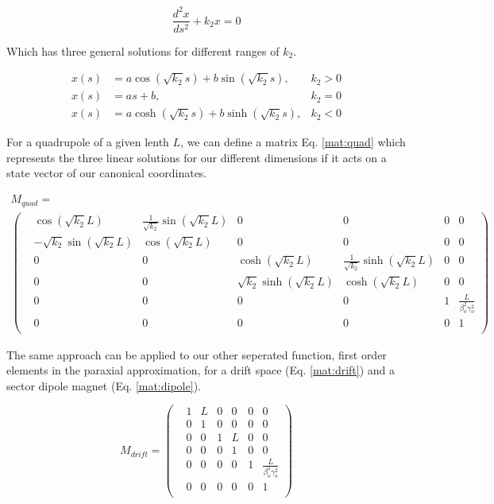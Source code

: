 \begin{equation} \label{eq:hills}
	\frac{d^2 x}{ds^2} + k_2 x = 0
\end{equation}

Which has three general solutions for different ranges of $k_2$.

\begin{align} \label{eq:hillSol}
	x(s) &= a \cos{\left(\sqrt{k_2} s\right)} + b \sin{\left(\sqrt{k_2} s\right)}, &k_2>0\\
	x(s) &= a s + b, &k_2 =0 \\
	x(s) &= a \cosh{\left(\sqrt{k_2} s\right)} + b \sinh{\left(\sqrt{k_2} s\right)}, &k_2<0
\end{align}

For a quadrupole of a given lenth $L$, we can define a matrix Eq. \ref{mat:quad} which represents the three linear solutions for our different dimensions if it acts on a state vector of our canonical coordinates.

\begin{multline} \label{mat:quad}
	M_{quad} = \\
\begin{pmatrix} 
	&\cos{\left(\sqrt{k_2} L\right)} &\frac{1}{\sqrt{k_2}}\sin{\left(\sqrt{k_2} L\right)} &0 &0 &0 &0\\
	&-\sqrt{k_2}\sin{\left(\sqrt{k_2} L\right)} &\cos{\left(\sqrt{k_2} L\right)} &0 &0 &0 &0\\
	&0 &0 &\cosh{\left(\sqrt{k_2} L\right)} &\frac{1}{\sqrt{k_2}}\sinh{\left(\sqrt{k_2} L\right)} &0 &0\\
	&0 &0 &\sqrt{k_2}\sinh{\left(\sqrt{k_2} L\right)} &\cosh{\left(\sqrt{k_2} L\right)} &0 &0\\
	&0 &0 &0 &0 &1 &\frac{L}{\beta_o^2\gamma_o^2}\\
	&0 &0 &0 &0 &0 &1\\
\end{pmatrix}
\end{multline}

The same approach can be applied to our other seperated function, first order elements in the paraxial approximation, for a drift space (Eq. \ref{mat:drift}) and a sector dipole magnet (Eq. \ref{mat:dipole}).

\begin{equation} \label{mat:drift}
	M_{drift} =
\begin{pmatrix}
	&1 &L &0 &0 &0 &0\\
	&0 &1 &0 &0 &0 &0\\
	&0 &0 &1 &L &0 &0\\
	&0 &0 &0 &1 &0 &0\\
	&0 &0 &0 &0 &1 &\frac{L}{\beta_o^2\gamma_o^2}\\
	&0 &0 &0 &0 &0 &1\\
\end{pmatrix}
\end{equation}

